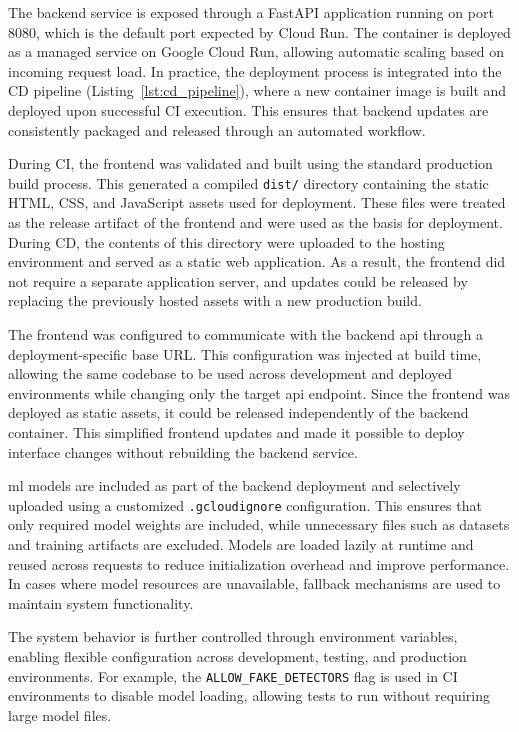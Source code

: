 The backend service is exposed through a FastAPI application running on port 8080, which is the default port expected by Cloud Run. The container is deployed as a managed service on Google Cloud Run, allowing automatic scaling based on incoming request load. In practice, the deployment process is integrated into the CD pipeline (Listing~\ref{lst:cd_pipeline}), where a new container image is built and deployed upon successful CI execution. This ensures that backend updates are consistently packaged and released through an automated workflow.


During CI, the frontend was validated and built using the standard production build process. This generated a compiled \texttt{dist/} directory containing the static HTML, CSS, and JavaScript assets used for deployment. These files were treated as the release artifact of the frontend and were used as the basis for deployment. During CD, the contents of this directory were uploaded to the hosting environment and served as a static web application. As a result, the frontend did not require a separate application server, and updates could be released by replacing the previously hosted assets with a new production build.

The frontend was configured to communicate with the backend \acrshort{api} through a deployment-specific base URL. This configuration was injected at build time, allowing the same codebase to be used across development and deployed environments while changing only the target \acrshort{api} endpoint. Since the frontend was deployed as static assets, it could be released independently of the backend container. This simplified frontend updates and made it possible to deploy interface changes without rebuilding the backend service.


\acrshort{ml} models are included as part of the backend deployment and selectively uploaded using a customized \texttt{.gcloudignore} configuration. This ensures that only required model weights are included, while unnecessary files such as datasets and training artifacts are excluded. Models are loaded lazily at runtime and reused across requests to reduce initialization overhead and improve performance. In cases where model resources are unavailable, fallback mechanisms are used to maintain system functionality.

The system behavior is further controlled through environment variables, enabling flexible configuration across development, testing, and production environments. For example, the \texttt{ALLOW\_FAKE\_DETECTORS} flag is used in CI environments to disable model loading, allowing tests to run without requiring large model files.

